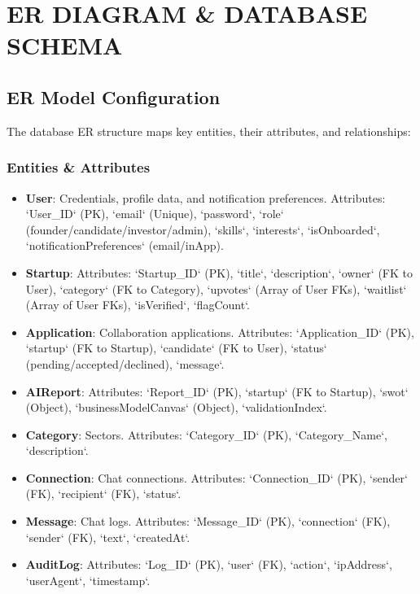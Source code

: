 \documentclass[12pt,a4paper]{report}
\begin{document}
\chapter{ER DIAGRAM \& DATABASE SCHEMA}

\section{ER Model Configuration}
The database ER structure maps key entities, their attributes, and relationships:

\subsection{Entities & Attributes}
\begin{itemize}
    \item \textbf{User}: Credentials, profile data, and notification preferences. Attributes: `User\_ID` (PK), `email` (Unique), `password`, `role` (founder/candidate/investor/admin), `skills`, `interests`, `isOnboarded`, `notificationPreferences` (email/inApp).
    \item \textbf{Startup}: Attributes: `Startup\_ID` (PK), `title`, `description`, `owner` (FK to User), `category` (FK to Category), `upvotes` (Array of User FKs), `waitlist` (Array of User FKs), `isVerified`, `flagCount`.
    \item \textbf{Application}: Collaboration applications. Attributes: `Application\_ID` (PK), `startup` (FK to Startup), `candidate` (FK to User), `status` (pending/accepted/declined), `message`.
    \item \textbf{AIReport}: Attributes: `Report\_ID` (PK), `startup` (FK to Startup), `swot` (Object), `businessModelCanvas` (Object), `validationIndex`.
    \item \textbf{Category}: Sectors. Attributes: `Category\_ID` (PK), `Category\_Name`, `description`.
    \item \textbf{Connection}: Chat connections. Attributes: `Connection\_ID` (PK), `sender` (FK), `recipient` (FK), `status`.
    \item \textbf{Message}: Chat logs. Attributes: `Message\_ID` (PK), `connection` (FK), `sender` (FK), `text`, `createdAt`.
    \item \textbf{AuditLog}: Attributes: `Log\_ID` (PK), `user` (FK), `action`, `ipAddress`, `userAgent`, `timestamp`.
\end{itemize}
\end{document}
